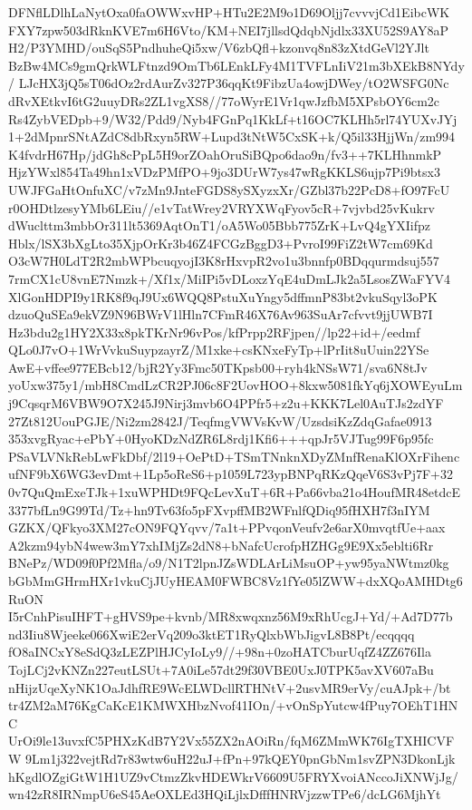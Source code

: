 {{DFNflLDlhLaNytOxa0faOWWxvHP+HTu2E2M9o1D69Oljj7cvvvjCd1EibcWK
FXY7zpw503dRknKVE7m6H6Vto/KM+NEI7jllsdQdqbNjdlx33XU52S9AY8aP
H2/P3YMHD/ouSqS5PndhuheQi5xw/V6zbQfl+kzonvq8n83zXtdGeVl2YJlt
BzBw4MCs9gmQrkWLFtnzd9OmTb6LEnkLFy4M1TVFLnIiV21m3bXEkB8NYdy/
LJcHX3jQ5sT06dOz2rdAurZv327P36qqKt9FibzUa4owjDWey/tO2WSFG0Nc
dRvXEtkvI6tG2uuyDRs2ZL1vgXS8//77oWyrE1Vr1qwJzfbM5XPsbOY6cm2c
Rs4ZybVEDpb+9/W32/Pdd9/Nyb4FGnPq1KkLf+t16OC7KLHh5rl74YUXvJYj
1+2dMpnrSNtAZdC8dbRxyn5RW+Lupd3tNtW5CxSK+k/Q5il33HjjWn/zm994
K4fvdrH67Hp/jdGh8cPpL5H9orZOahOruSiBQpo6dao9n/fv3++7KLHhnmkP
HjzYWxl854Ta49hn1xVDzPMfPO+9jo3DUrW7ys47wRgKKLS6ujp7Pi9btsx3
UWJFGaHtOnfuXC/v7zMn9JnteFGDS8ySXyzxXr/GZbl37b22PcD8+fO97FcU
r0OHDtlzesyYMb6LEiu//e1vTatWrey2VRYXWqFyov5cR+7vjvbd25vKukrv
dWuclttm3mbbOr311lt5369AqtOnT1/oA5Wo05Bbb775ZrK+LvQ4gYXIifpz
Hblx/lSX3bXgLto35XjpOrKr3b46Z4FCGzBggD3+PvroI99FiZ2tW7cm69Kd
O3cW7H0LdT2R2mbWPbcuqyojI3K8rHxvpR2vo1u3bnnfp0BDqqurmdsuj557
7rmCX1cU8vnE7Nmzk+/Xf1x/MiIPi5vDLoxzYqE4uDmLJk2a5LsosZWaFYV4
XlGonHDPI9y1RK8f9qJ9Ux6WQQ8PstuXuYngy5dffmnP83bt2vkuSqyl3oPK
dzuoQuSEa9ekVZ9N96BWrV1lHln7CFmR46X76Av963SuAr7cfvvt9jjUWB7I
Hz3bdu2g1HY2X33x8pkTKrNr96vPos/kfPrpp2RFjpen//lp22+id+/eedmf
QLo0J7vO+1WrVvkuSuypzayrZ/M1xke+csKNxeFyTp+lPrIit8uUuin22YSe
AwE+vffee977EBcb12/bjR2Yy3Fmc50TKpsb00+ryh4kNSsW71/sva6N8tJv
yoUxw375y1/mbH8CmdLzCR2PJ06c8F2UovHOO+8kxw5081fkYq6jXOWEyuLm
j9CqsqrM6VBW9O7X245J9Nirj3mvb6O4PPfr5+z2u+KKK7Lel0AuTJs2zdYF
27Zt812UouPGJE/Ni2zm2842J/TeqfmgVWVsKvW/UzsdsiKzZdqGafae0913
353xvgRyac+ePbY+0HyoKDzNdZR6L8rdj1Kfi6+++qpJr5VJTug99F6p95fc
PSaVLVNkRebLwFkDbf/2l19+OePtD+TSmTNnknXDyZMnfRenaKlOXrFihenc
ufNF9bX6WG3evDmt+1Lp5oReS6+p1059L723ypBNPqRKzQqeV6S3vPj7F+32
0v7QuQmExeTJk+1xuWPHDt9FQcLevXuT+6R+Pa66vba21o4HoufMR48etdcE
3377bfLn9G99Td/Tz+hn9Tv63fo5pFXvpffMB2WFnlfQDiq95fHXH7f3nIYM
GZKX/QFkyo3XM27cON9FQYqvv/7a1t+PPvqonVeufv2e6arX0mvqtfUe+aax
A2kzm94ybN4wew3mY7xhIMjZs2dN8+bNafcUcrofpHZHGg9E9Xx5eblti6Rr
BNePz/WD09f0Pf2Mfla/o9/N1T2lpnJZsWDLArLiMsuOP+yw95yaNWtmz0kg
bGbMmGHrmHXr1vkuCjJUyHEAM0FWBC8Vz1fYe05lZWW+dxXQoAMHDtg6RuON
I5rCnhPisuIHFT+gHVS9pe+kvnb/MR8xwqxnz56M9xRhUcgJ+Yd/+Ad7D77b
nd3Iiu8Wjeeke066XwiE2erVq209o3ktET1RyQlxbWbJigvL8B8Pt/ecqqqq
fO8aINCxY8eSdQ3zLEZPlHJCyIoLy9//+98n+0zoHATCburUqfZ4ZZ676Ila
TojLCj2vKNZn227eutLSUt+7A0iLe57dt29f30VBE0UxJ0TPK5avXV607aBu
nHijzUqeXyNK1OaJdhfRE9WcELWDcllRTHNtV+2usvMR9erVy/cuAJpk+/bt
tr4ZM2aM76KgCaKcE1KMWXHbzNvof41IOn/+vOnSpYutcw4fPuy7OEhT1HNC
UrOi9le13uvxfC5PHXzKdB7Y2Vx55ZX2nAOiRn/fqM6ZMmWK76IgTXHICVFW
9Lm1j322vejtRd7r83wtw6uH22uJ+fPn+97kQEY0pnGbNm1svZPN3DkonLjk
hKgdlOZgiGtW1H1UZ9vCtmzZkvHDEWkrV6609U5FRYXvoiANccoJiXNWjJg/
wn42zR8IRNmpU6eS45AeOXLEd3HQiLjlxDfffHNRVjzzwTPe6/dcLG6MjhYt
}}

